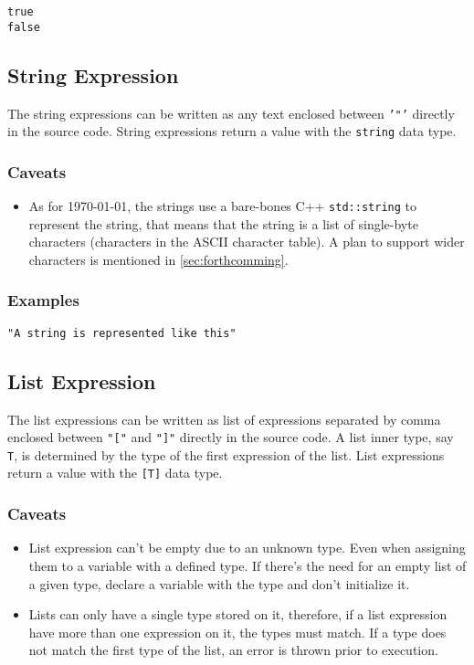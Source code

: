 \begin{lstlisting}
true
false
\end{lstlisting}

\subsection{String Expression}

The string expressions can be written as any text enclosed between \texttt{'"'} directly in the source code.
String expressions return a value with the \texttt{string} data type.

\subsubsection{Caveats}

\begin{itemize}
    \item As for \today, the strings use a bare-bones C++ \texttt{std::string} to represent the string, that means that the string
        is a list of single-byte characters (characters in the ASCII character table). A plan to support wider characters is mentioned
        in \autoref{sec:forthcomming}.
\end{itemize}

\subsubsection{Examples}

\begin{lstlisting}
"A string is represented like this"
\end{lstlisting}

\subsection{List Expression}

The list expressions can be written as list of expressions separated by comma enclosed between \texttt{"["} and \texttt{"]"}
directly in the source code. A list inner type, say \texttt{T}, is determined by the type of the first expression of the list.
List expressions return a value with the \texttt{[T]} data type.

\subsubsection{Caveats}

\begin{itemize}
    \item List expression can't be empty due to an unknown type. Even when assigning them to a variable with a defined type. If there's the
        need for an empty list of a given type, declare a variable with the type and don't initialize it.
    \item Lists can only have a single type stored on it, therefore, if a list expression have more than one expression on it, the types
        must match. If a type does not match the first type of the list, an error is thrown prior to execution.
\end{itemize}

